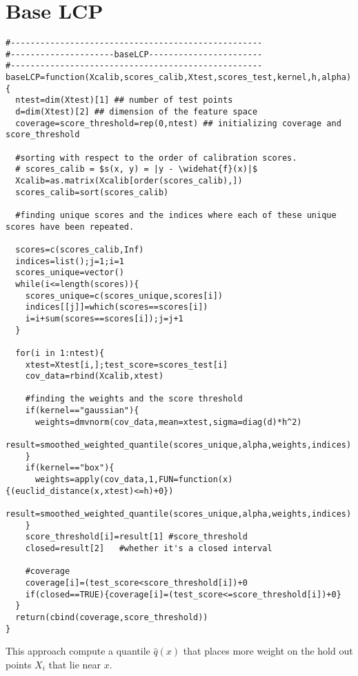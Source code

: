 \documentclass[UTF8, a4paper]{article}
\begin{document}
\section{Base LCP}


\begin{verbatim}
#---------------------------------------------------
#---------------------baseLCP-----------------------
#---------------------------------------------------
baseLCP=function(Xcalib,scores_calib,Xtest,scores_test,kernel,h,alpha){
  ntest=dim(Xtest)[1] ## number of test points
  d=dim(Xtest)[2] ## dimension of the feature space
  coverage=score_threshold=rep(0,ntest) ## initializing coverage and score_threshold
  
  #sorting with respect to the order of calibration scores.
  # scores_calib = $s(x, y) = |y - \widehat{f}(x)|$
  Xcalib=as.matrix(Xcalib[order(scores_calib),])
  scores_calib=sort(scores_calib)
  
  #finding unique scores and the indices where each of these unique scores have been repeated.

  scores=c(scores_calib,Inf)
  indices=list();j=1;i=1
  scores_unique=vector()
  while(i<=length(scores)){
    scores_unique=c(scores_unique,scores[i])
    indices[[j]]=which(scores==scores[i])
    i=i+sum(scores==scores[i]);j=j+1
  }
  
  for(i in 1:ntest){
    xtest=Xtest[i,];test_score=scores_test[i]
    cov_data=rbind(Xcalib,xtest)
    
    #finding the weights and the score threshold
    if(kernel=="gaussian"){
      weights=dmvnorm(cov_data,mean=xtest,sigma=diag(d)*h^2)
      result=smoothed_weighted_quantile(scores_unique,alpha,weights,indices)
    }
    if(kernel=="box"){
      weights=apply(cov_data,1,FUN=function(x){(euclid_distance(x,xtest)<=h)+0})
      result=smoothed_weighted_quantile(scores_unique,alpha,weights,indices)
    }
    score_threshold[i]=result[1] #score_threshold
    closed=result[2]   #whether it's a closed interval
    
    #coverage
    coverage[i]=(test_score<score_threshold[i])+0
    if(closed==TRUE){coverage[i]=(test_score<=score_threshold[i])+0}
  }
  return(cbind(coverage,score_threshold))
}
\end{verbatim}


This approach compute a quantile \(\widehat{q}(x)\) that places more weight on the hold out points \(X_i\) that lie near \(x\).
\end{document}
